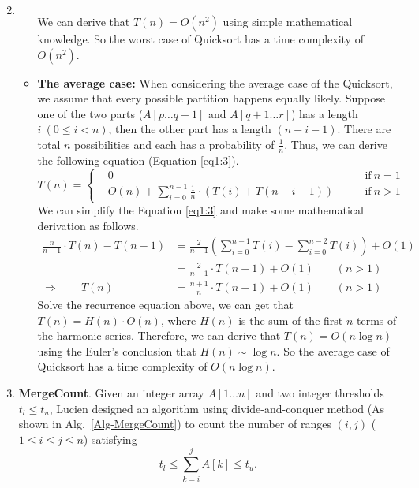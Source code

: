 \documentclass[12pt,a4paper]{article}
\makeatletter
\newtheorem*{solution}{Solution}
\theoremstyle{definition}
\renewenvironment{solution}[1][Solution] {\par\pushQED{\qed}\normalfont\topsep6\p@\@plus6\p@\relax\trivlist\item[\hskip\labelsep\bfseries#1\@addpunct{.}]\ignorespaces}{\popQED\endtrivlist\@endpefalse} \makeatother
\makeatother
\begin{document}
\begin{enumerate}
\begin{solution}
\begin{itemize}
\begin{equation}
        \end{equation}
        We can derive that $T(n) = O(n^2)$ using simple mathematical knowledge. So the worst case of Quicksort has a time complexity of $O(n^2)$.
    \item \textbf{The average case:} When considering the average case of the Quicksort, we assume that every possible partition happens equally likely. Suppose one of the two parts ($A[p \ldots q-1]$ and $A[q+1 \ldots r]$) has a length $i\ (0 \leq i < n)$, then the other part has a length $(n - i - 1)$. There are total $n$ possibilities and each has a probability of $\frac{1}{n}$. Thus, we can derive the following equation (Equation \eqref{eq1:3}).
        \begin{equation}
          T(n) = \left\{
          \begin{aligned}
          & 0 & \quad \quad \mathrm{if\ } n = 1 \\
          & O(n) + \sum_{i=0}^{n-1}\frac{1}{n} \cdot (T(i) + T(n - i - 1)) & \quad \quad \mathrm{if\ } n > 1
          \end{aligned}
          \right.
          \label{eq1:3}
        \end{equation}
        We can simplify the Equation \eqref{eq1:3} and make some mathematical derivation as follows.
        \begin{displaymath}
          \begin{aligned}
          \frac{n}{n-1} \cdot T(n) - T(n-1)  &= \frac{2}{n-1} \left(\sum_{i=0}^{n-1} T(i) - \sum_{i=0}^{n-2} T(i)\right) + O(1) \\
                                             &= \frac{2}{n-1} \cdot T(n-1) + O(1) \quad \quad (n > 1)\\
          \Longrightarrow \quad \quad T(n) &= \frac{n+1}{n} \cdot T(n-1) + O(1) \quad \quad (n > 1)
          \end{aligned}
        \end{displaymath}
        Solve the recurrence equation above, we can get that $T(n) = H(n) \cdot O(n)$, where $H(n)$ is the sum of the first $n$ terms of the harmonic series. Therefore, we can derive that $T(n) = O(n\log{n})$ using the Euler's conclusion that $H(n) \sim \log{n}$. So the average case of Quicksort has a time complexity of $O(n\log{n})$.
    \end{itemize}
    \end{solution}

    \clearpage
    \item
    \textbf{MergeCount}. Given an integer array $A[1 \ldots n]$ and two integer thresholds $t_l \le t_u$, Lucien designed an algorithm using divide-and-conquer method (As shown in Alg.~\ref{Alg-MergeCount}) to count the number of ranges $(i,j)$ ($1 \leq i \leq j \leq n$) satisfying
    \begin{equation}\label{Eqn-MergeCount}
    t_l \leq \sum_{k=i}^{j}{A[k]} \leq t_u.
    \end{equation}


\end{enumerate}
\end{document}
